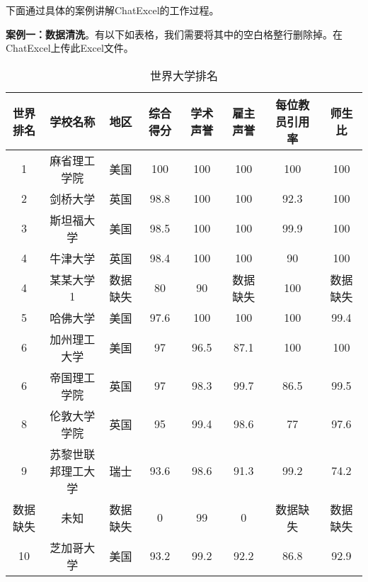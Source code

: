下面通过具体的案例讲解ChatExcel的工作过程。

\textbf{案例一：数据清洗}。有以下如表格，我们需要将其中的空白格整行删除掉。在ChatExcel上传此Excel文件。
\begin{table}[h]
    \centering
    \caption{世界大学排名}
    \footnotesize
    \begin{tabular}{cccccccc}
        \toprule
        世界排名 & 学校名称 & 地区 & 综合得分 & 学术声誉 & 雇主声誉 & 每位教员引用率 & 师生比 \\
        \midrule
        1  & 麻省理工学院     & 美国 & 100  & 100  & 100  & 100  & 100  \\
        2  & 剑桥大学         & 英国 & 98.8 & 100  & 100  & 92.3 & 100  \\
        3  & 斯坦福大学       & 美国 & 98.5 & 100  & 100  & 99.9 & 100  \\
        4  & 牛津大学         & 英国 & 98.4 & 100  & 100  & 90   & 100  \\
        4  & 某某大学1        & 数据缺失 & 80   & 90   & 数据缺失 & 100  & 数据缺失 \\
        5  & 哈佛大学         & 美国 & 97.6 & 100  & 100  & 100  & 99.4 \\
        6  & 加州理工大学     & 美国 & 97   & 96.5 & 87.1 & 100  & 100  \\
        6  & 帝国理工学院     & 英国 & 97   & 98.3 & 99.7 & 86.5 & 99.5 \\
        8  & 伦敦大学学院     & 英国 & 95   & 99.4 & 98.6 & 77   & 97.6 \\
        9  & 苏黎世联邦理工大学 & 瑞士 & 93.6 & 98.6 & 91.3 & 99.2 & 74.2 \\
        数据缺失  & 未知             & 数据缺失 & 0    & 99   & 0    & 数据缺失 & 数据缺失 \\
        10 & 芝加哥大学       & 美国 & 93.2 & 99.2 & 92.2 & 86.8 & 92.9 \\
        \bottomrule
    \end{tabular}
    
    \label{tab:world_ranking1}
\end{table}
\FloatBarrier





